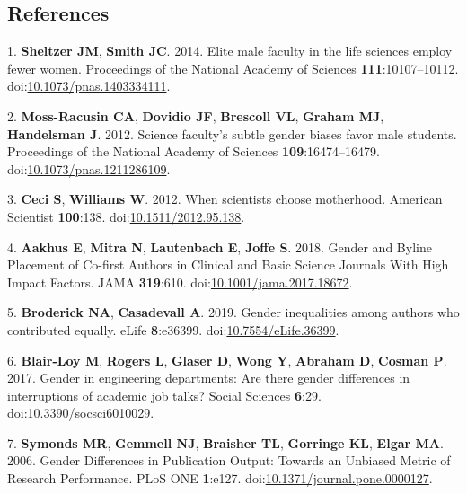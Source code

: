 \documentclass[11pt,]{article}
\begin{document}
\newpage

\subsection{References}\label{references}

\hypertarget{refs}{}
\hypertarget{ref-sheltzer_elite_2014}{}
1. \textbf{Sheltzer JM}, \textbf{Smith JC}. 2014. Elite male faculty in
the life sciences employ fewer women. Proceedings of the National
Academy of Sciences \textbf{111}:10107--10112.
doi:\href{https://doi.org/10.1073/pnas.1403334111}{10.1073/pnas.1403334111}.

\hypertarget{ref-moss-racusin_science_2012}{}
2. \textbf{Moss-Racusin CA}, \textbf{Dovidio JF}, \textbf{Brescoll VL},
\textbf{Graham MJ}, \textbf{Handelsman J}. 2012. Science faculty's
subtle gender biases favor male students. Proceedings of the National
Academy of Sciences \textbf{109}:16474--16479.
doi:\href{https://doi.org/10.1073/pnas.1211286109}{10.1073/pnas.1211286109}.

\hypertarget{ref-Ceci2012}{}
3. \textbf{Ceci S}, \textbf{Williams W}. 2012. When scientists choose
motherhood. American Scientist \textbf{100}:138.
doi:\href{https://doi.org/10.1511/2012.95.138}{10.1511/2012.95.138}.

\hypertarget{ref-aakhus_gender_2018}{}
4. \textbf{Aakhus E}, \textbf{Mitra N}, \textbf{Lautenbach E},
\textbf{Joffe S}. 2018. Gender and Byline Placement of Co-first Authors
in Clinical and Basic Science Journals With High Impact Factors. JAMA
\textbf{319}:610.
doi:\href{https://doi.org/10.1001/jama.2017.18672}{10.1001/jama.2017.18672}.

\hypertarget{ref-broderick_gender_2019}{}
5. \textbf{Broderick NA}, \textbf{Casadevall A}. 2019. Gender
inequalities among authors who contributed equally. eLife
\textbf{8}:e36399.
doi:\href{https://doi.org/10.7554/eLife.36399}{10.7554/eLife.36399}.

\hypertarget{ref-BlairLoy2017}{}
6. \textbf{Blair-Loy M}, \textbf{Rogers L}, \textbf{Glaser D},
\textbf{Wong Y}, \textbf{Abraham D}, \textbf{Cosman P}. 2017. Gender in
engineering departments: Are there gender differences in interruptions
of academic job talks? Social Sciences \textbf{6}:29.
doi:\href{https://doi.org/10.3390/socsci6010029}{10.3390/socsci6010029}.

\hypertarget{ref-symonds_gender_2006}{}
7. \textbf{Symonds MR}, \textbf{Gemmell NJ}, \textbf{Braisher TL},
\textbf{Gorringe KL}, \textbf{Elgar MA}. 2006. Gender Differences in
Publication Output: Towards an Unbiased Metric of Research Performance.
PLoS ONE \textbf{1}:e127.
doi:\href{https://doi.org/10.1371/journal.pone.0000127}{10.1371/journal.pone.0000127}.
\end{document}
